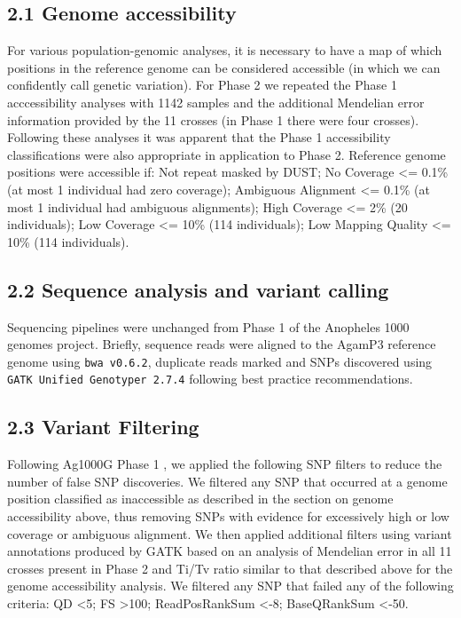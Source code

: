 \documentclass[a4paper,11pt,abstracton,hidelinks]{scrartcl}
\begin{document}
\subsection*{2.1 Genome accessibility}

%
For various population-genomic analyses, it is necessary to have a map of which positions in the reference genome can be considered accessible (in which we can confidently call genetic variation).
%
For Phase 2 we repeated the Phase 1 acccessibility analyses \cite{Ag1000gConsortium2017} with 1142 samples and the additional Mendelian error information provided by the 11 crosses (in Phase 1 there were four crosses).
%
Following these analyses it was apparent that the Phase 1 accessibility classifications were also appropriate in application to Phase 2.
%
Reference genome positions were accessible if: 
Not repeat masked by DUST; 
No Coverage <= 0.1\% (at most 1 individual had zero coverage); 
Ambiguous Alignment <= 0.1\% (at most 1 individual had ambiguous alignments); 
High Coverage <= 2\% (20 individuals); 
Low Coverage <= 10\% (114 individuals); 
Low Mapping Quality <= 10\% (114 individuals).

\subsection*{2.2 Sequence analysis and variant calling}
%
Sequencing pipelines were unchanged from Phase 1 of the Anopheles 1000 genomes project\cite{Ag1000gConsortium2017}.
%
Briefly, sequence reads were aligned to the AgamP3 reference genome \cite{sharakhova2007update} using \texttt{bwa v0.6.2}, duplicate reads marked \cite{li2009} and SNPs discovered using \texttt{GATK Unified Genotyper 2.7.4} \cite{van2013} following best practice recommendations. 


\subsection*{2.3 Variant Filtering}
%
Following Ag1000G Phase 1 \cite{Ag1000gConsortium2017}, we applied the following SNP filters to reduce the number of false SNP discoveries.
%
We filtered any SNP that occurred at a genome position classified as inaccessible as described in the section on genome accessibility above, thus removing SNPs with evidence for excessively high or low coverage or ambiguous alignment. 
%
We then applied additional filters using variant annotations produced by GATK based on an analysis of Mendelian error in all 11 crosses present in Phase 2 and Ti/Tv ratio similar to that described above for the genome accessibility analysis.
%
We filtered any SNP that failed any of the following criteria: QD <5; FS >100; ReadPosRankSum <-8; BaseQRankSum <-50. 
\end{document}

